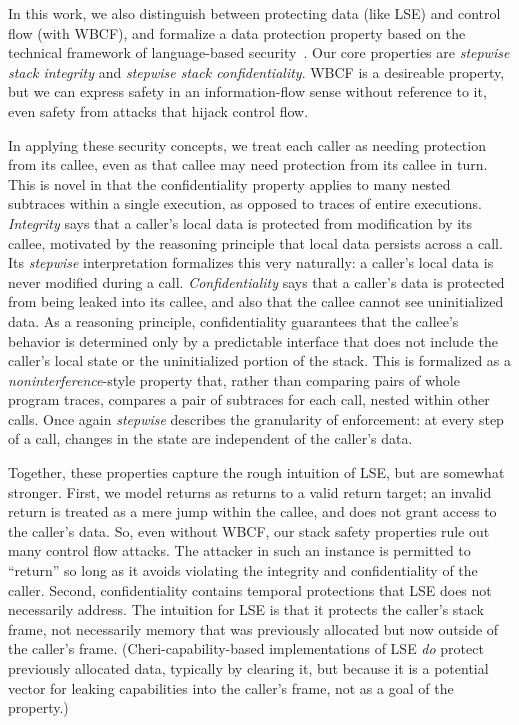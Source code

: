 \documentclass[acmsmall,review,anonymous]{acmart}\settopmatter{printfolios=true,printccs=false,printacmref=false}
\begin{document}
In this work, we also distinguish between protecting data (like LSE) and
control flow (with WBCF), and formalize a data protection property
based on the technical framework of language-based security~\citep{??}.
Our core properties are \emph{stepwise stack integrity} and
\emph{stepwise stack confidentiality}. WBCF is a desireable property, but
we can express safety in an information-flow sense without reference to it,
even safety from attacks that hijack control flow.

In applying these security concepts, we treat each caller as needing protection
from its callee, even as that callee may need protection from its callee in turn.
This is novel in that the
confidentiality property applies to many nested subtraces within a single execution,
as opposed to traces of entire executions.
{\em Integrity} says that a caller's local data is protected from modification by its callee,
motivated by the reasoning principle that local data persists across a call. Its
{\em stepwise} interpretation formalizes this very naturally: a caller's local data
is never modified during a call. {\em Confidentiality} says that a caller's data is protected
from being leaked into its callee, and also that the callee cannot see uninitialized data.
As a reasoning principle, confidentiality guarantees that the callee's
behavior is determined only by a predictable interface that does not include the caller's
local state or the uninitialized portion of the stack. This is formalized as a
{\em noninterference}-style property that, rather than comparing pairs of whole program traces,
compares a pair of subtraces for each call, nested within other calls. Once again
{\em stepwise} describes the granularity of enforcement: at every step of a call,
changes in the state are independent of the caller's data.

Together, these properties capture the rough intuition of LSE, but are somewhat stronger.
First, we model returns as returns to a valid return target; an invalid return
is treated as a mere jump within the callee, and does not grant access to the caller's
data. So, even without WBCF, our stack safety properties rule out many control flow attacks.
The attacker in such an instance is permitted to ``return'' so long as it avoids
violating the integrity and confidentiality of the caller. Second, confidentiality
contains temporal protections that LSE does not necessarily address. The intuition
for LSE is that it protects the caller's stack frame, not necessarily memory that was
previously allocated but now outside of the caller's frame. (Cheri-capability-based
implementations of LSE {\em do} protect previously allocated data, typically by clearing
it, but because it is a potential vector for leaking capabilities into the caller's frame,
not as a goal of the property.)
\end{document}
